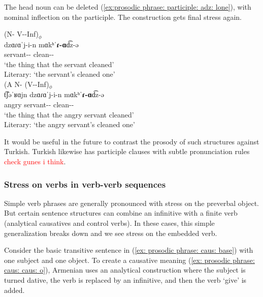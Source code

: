 The head noun can be deleted (\ref{ex:prosodic phrase: participle: adz: lone}), with nominal inflection on the participle. The construction gets final stress again. 


\begin{exe}
	\ex \label{ex:prosodic phrase: participle: adz: lone}
	\begin{xlist}
		\ex \glll (N-{\gen} V-{\rptcp}-Inf)$_\phi$
		\\
		{{dzɑɾɑˈ{j-i-n}}}  {mɑkʰˈ\textbf{ɾ-ɑ}d͡z-ə} 
		\\
		servant-{\gen}-{}  clean-{\rptcp}-{} 
		\\
		\trans `the thing that the servant cleaned' \\
		Literary:  `the servant's cleaned one'   
		\\ 
		\ex \glll (A {N-{\gen}} (V-{\rptcp}-Inf)$_\phi$
		\\
		t͡ʃəˈʁɑjn  {{dzɑɾɑˈ{j-i-n}}}   {mɑkʰˈ\textbf{ɾ-ɑ}d͡z-ə} 
		\\
		angry servant-{\gen}-{}  clean-{\rptcp}-{} 
		\\
		\trans `the thing that the angry servant cleaned' \\
		Literary:  `the angry servant's cleaned one'  
		\\ 
	\end{xlist}
\end{exe}

It would be useful in the future to contrast the prosody of such structures against Turkish. Turkish likewise has participle clauses with subtle pronunciation rules \textcolor{red}{check gunes i think}. 


\subsubsection{Stress on verbs in verb-verb sequences}\label{section:intonation:phrase:nounverb:caus}
Simple verb phrases are generally pronounced with stress on the preverbal object. But certain sentence structures can combine an infinitive with a finite verb (analytical causatives and control verbs). In these  cases,    this simple generalization breaks down and we see stress on the embedded verb. 


Consider the basic transitive sentence in (\ref{ex: prosodic phrase: caus: base}) with one subject and one object. To create a causative meaning (\ref{ex: prosodic phrase: caus: caus: o}), Armenian uses an analytical construction where     the subject is turned dative, the verb is replaced by an infinitive, and then the verb `give' is added. 

